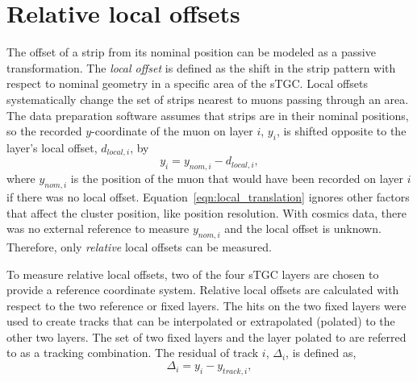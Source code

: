 
\section{Relative local offsets}

The offset of a strip from its nominal position can be modeled as a passive transformation. The \textit{local offset} is defined as the shift in the strip pattern with respect to nominal geometry in a specific area of the sTGC. Local offsets systematically change the set of strips nearest to muons passing through an area. The data preparation software assumes that strips are in their nominal positions, so the recorded $y$-coordinate of the muon on layer $i$, $y_i$, is shifted opposite to the layer's local offset, $d_{local, i}$, by
\begin{equation}
    y_i = y_{nom, i} - d_{local, i},
    \label{eqn:local_translation}
\end{equation}
where $y_{nom, i}$ is the position of the muon that would have been recorded on layer $i$ if there was no local offset. Equation~\ref{eqn:local_translation} ignores other factors that affect the cluster position, like position resolution. With cosmics data, there was no external reference to measure $y_{nom, i}$ and the local offset is unknown. Therefore, only {\em relative} local offsets can be measured. 

To measure relative local offsets, two of the four sTGC layers are chosen to provide a reference coordinate system. Relative local offsets are calculated with respect to the two reference or fixed layers. The hits on the two fixed layers were used to create tracks that can be interpolated or extrapolated (polated) to the other two layers. The set of two fixed layers and the layer polated to are referred to as a tracking combination. The residual of track $i$, $\Delta_i$, is defined as,
\begin{equation}
    \Delta_i = y_{i} - y_{track, i},
    \label{eqn:residual}
\end{equation}

